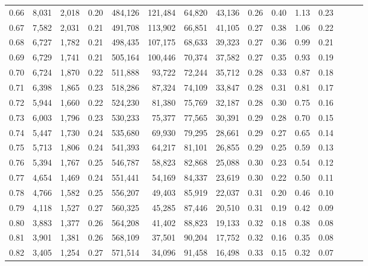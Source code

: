 \begin{tabular}{rrrrrrrrrrrrrrr}
0.66 &   8,031 &  2,018 &  0.20 &  484,126 &  121,484 &   64,820 &   43,136 &  0.26 &  0.40 &  1.13 &      0.23 \\
0.67 &   7,582 &  2,031 &  0.21 &  491,708 &  113,902 &   66,851 &   41,105 &  0.27 &  0.38 &  1.06 &      0.22 \\
0.68 &   6,727 &  1,782 &  0.21 &  498,435 &  107,175 &   68,633 &   39,323 &  0.27 &  0.36 &  0.99 &      0.21 \\
0.69 &   6,729 &  1,741 &  0.21 &  505,164 &  100,446 &   70,374 &   37,582 &  0.27 &  0.35 &  0.93 &      0.19 \\
0.70 &   6,724 &  1,870 &  0.22 &  511,888 &   93,722 &   72,244 &   35,712 &  0.28 &  0.33 &  0.87 &      0.18 \\
0.71 &   6,398 &  1,865 &  0.23 &  518,286 &   87,324 &   74,109 &   33,847 &  0.28 &  0.31 &  0.81 &      0.17 \\
0.72 &   5,944 &  1,660 &  0.22 &  524,230 &   81,380 &   75,769 &   32,187 &  0.28 &  0.30 &  0.75 &      0.16 \\
0.73 &   6,003 &  1,796 &  0.23 &  530,233 &   75,377 &   77,565 &   30,391 &  0.29 &  0.28 &  0.70 &      0.15 \\
0.74 &   5,447 &  1,730 &  0.24 &  535,680 &   69,930 &   79,295 &   28,661 &  0.29 &  0.27 &  0.65 &      0.14 \\
0.75 &   5,713 &  1,806 &  0.24 &  541,393 &   64,217 &   81,101 &   26,855 &  0.29 &  0.25 &  0.59 &      0.13 \\
0.76 &   5,394 &  1,767 &  0.25 &  546,787 &   58,823 &   82,868 &   25,088 &  0.30 &  0.23 &  0.54 &      0.12 \\
0.77 &   4,654 &  1,469 &  0.24 &  551,441 &   54,169 &   84,337 &   23,619 &  0.30 &  0.22 &  0.50 &      0.11 \\
0.78 &   4,766 &  1,582 &  0.25 &  556,207 &   49,403 &   85,919 &   22,037 &  0.31 &  0.20 &  0.46 &      0.10 \\
0.79 &   4,118 &  1,527 &  0.27 &  560,325 &   45,285 &   87,446 &   20,510 &  0.31 &  0.19 &  0.42 &      0.09 \\
0.80 &   3,883 &  1,377 &  0.26 &  564,208 &   41,402 &   88,823 &   19,133 &  0.32 &  0.18 &  0.38 &      0.08 \\
0.81 &   3,901 &  1,381 &  0.26 &  568,109 &   37,501 &   90,204 &   17,752 &  0.32 &  0.16 &  0.35 &      0.08 \\
0.82 &   3,405 &  1,254 &  0.27 &  571,514 &   34,096 &   91,458 &   16,498 &  0.33 &  0.15 &  0.32 &      0.07 \\

\end{tabular}
